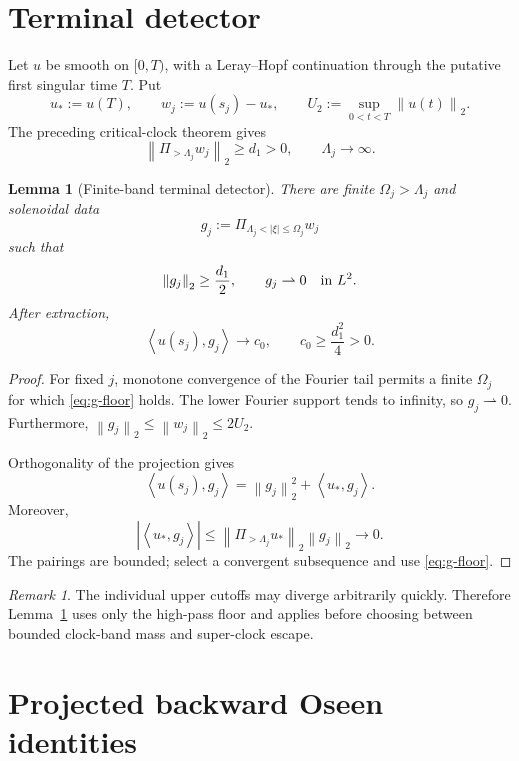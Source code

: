 \documentclass[11pt]{article}
\newtheorem{lemma}[theorem]{Lemma}
\theoremstyle{remark}
\newtheorem{remark}[theorem]{Remark}
\newcommand{\ip}[2]{\left\langle #1,#2\right\rangle}
\newcommand{\norm}[1]{\left\|#1\right\|}
\newcommand{\weakto}{\rightharpoonup}
\begin{document}
\section{Terminal detector}

Let \(u\) be smooth on \([0,T)\), with a Leray--Hopf continuation through
the putative first singular time \(T\).  Put
\[
 u_*:=u(T),
 \qquad
 w_j:=u(s_j)-u_*,
 \qquad
 U_2:=\sup_{0<t<T}\norm{u(t)}_2.
\]
The preceding critical-clock theorem gives
\begin{equation}
 \label{eq:highpass}
 \norm{\Pi_{>\Lambda_j}w_j}_2\geq d_1>0,
 \qquad
 \Lambda_j\longrightarrow\infty.
\end{equation}

\begin{lemma}[Finite-band terminal detector]
\label{lem:detector}
There are finite \(\Omega_j>\Lambda_j\) and solenoidal data
\[
 g_j
 :=
 \Pi_{\Lambda_j<|\xi|\leq\Omega_j}w_j
\]
such that
\begin{equation}
 \label{eq:g-floor}
 \norm{g_j}_2\geq\frac{d_1}{2},
 \qquad
 g_j\weakto0
 \quad\hbox{in }L^2.
\end{equation}
After extraction,
\begin{equation}
 \label{eq:terminal-pair}
 \ip{u(s_j)}{g_j}\longrightarrow c_0,
 \qquad
 c_0\geq\frac{d_1^2}{4}>0.
\end{equation}
\end{lemma}

\begin{proof}
For fixed \(j\), monotone convergence of the Fourier tail permits a
finite \(\Omega_j\) for which \eqref{eq:g-floor} holds.  The lower
Fourier support tends to infinity, so \(g_j\weakto0\).
Furthermore, \(\norm{g_j}_2\leq\norm{w_j}_2\leq2U_2\).

Orthogonality of the projection gives
\[
 \ip{u(s_j)}{g_j}
 =
 \norm{g_j}_2^2+\ip{u_*}{g_j}.
\]
Moreover,
\[
 |\ip{u_*}{g_j}|
 \leq
 \norm{\Pi_{>\Lambda_j}u_*}_2\norm{g_j}_2
 \longrightarrow0.
\]
The pairings are bounded; select a convergent subsequence and use
\eqref{eq:g-floor}.
\end{proof}

\begin{remark}
The individual upper cutoffs may diverge arbitrarily quickly.  Therefore
Lemma~\ref{lem:detector} uses only the high-pass floor and applies before
choosing between bounded clock-band mass and super-clock escape.
\end{remark}

\section{Projected backward Oseen identities}
\end{document}
